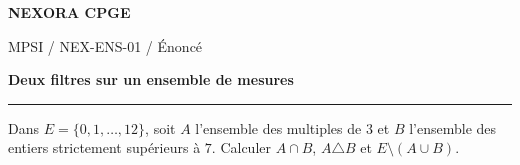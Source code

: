 \documentclass[11pt,a4paper]{article}
\begin{document}
{\small\bfseries\color{nexorablue} NEXORA CPGE}\par
{\small MPSI / NEX-ENS-01 / Énoncé}\par
{\LARGE\bfseries Deux filtres sur un ensemble de mesures}\par
\vspace{0.25em}\hrule\vspace{0.6em}

Dans $E=\{0,1,\ldots,12\}$, soit $A$ l’ensemble des multiples de $3$ et $B$ l’ensemble des entiers strictement supérieurs à $7$. Calculer $A\cap B$, $A\triangle B$ et $E\setminus(A\cup B)$.
\end{document}
